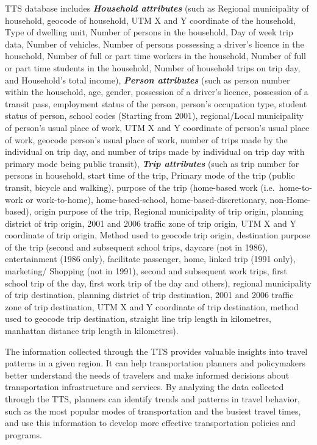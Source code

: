 \documentclass[
11pt, %
oneside, %
english, %
singlespacing, %
]{macthesis} %
\begin{document}
TTS database includes \textbf{\emph{Household attributes}} (such as Regional municipality of household, geocode of household, UTM X and Y coordinate of the household, Type of dwelling unit, Number of persons in the household, Day of week trip data, Number of vehicles, Number of persons possessing a driver's licence in the household, Number of full or part time workers in the household, Number of full or part time students in the household, Number of household trips on trip day, and Household's total income), \textbf{\emph{Person attributes}} (such as person number within the household, age, gender, possession of a driver's licence, possession of a transit pass, employment status of the person, person's occupation type, student status of person, school codes (Starting from 2001), regional/Local municipality of person's usual place of work, UTM X and Y coordinate of person's usual place of work, geocode person's usual place of work, number of trips made by the individual on trip day, and number of trips made by individual on trip day with primary mode being public transit), \textbf{\emph{Trip attributes}} (such as trip number for persons in household, start time of the trip, Primary mode of the trip (public transit, bicycle and walking), purpose of the trip (home-based work (i.e.~home-to-work or work-to-home), home-based-school, home-based-discretionary, non-Home-based), origin purpose of the trip, Regional municipality of trip origin, planning district of trip origin, 2001 and 2006 traffic zone of trip origin, UTM X and Y coordinate of trip origin, Method used to geocode trip origin, destination purpose of the trip (second and subsequent school trips, daycare (not in 1986), entertainment (1986 only), facilitate passenger, home, linked trip (1991 only), marketing/ Shopping (not in 1991), second and subsequent work trips, first school trip of the day, first work trip of the day and others), regional municipality of trip destination, planning district of trip destination, 2001 and 2006 traffic zone of trip destination, UTM X and Y coordinate of trip destination, method used to geocode trip destination, straight line trip length in kilometres, manhattan distance trip length in kilometres).

The information collected through the TTS provides valuable insights into travel patterns in a given region. It can help transportation planners and policymakers better understand the needs of travelers and make informed decisions about transportation infrastructure and services. By analyzing the data collected through the TTS, planners can identify trends and patterns in travel behavior, such as the most popular modes of transportation and the busiest travel times, and use this information to develop more effective transportation policies and programs.
\end{document}
